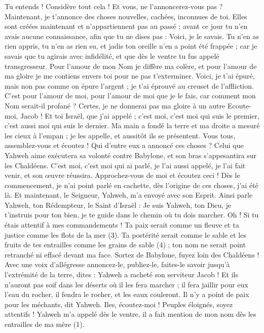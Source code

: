 \begin{multicols}{2}
{Tu entends ! Considère tout cela ! Et vous, ne l'annoncerez-vous pas ? Maintenant, je t’annonce des choses nouvelles, cachées, inconnues de toi.
Elles sont créées maintenant et n’appartiennent pas au passé ; avant ce jour tu n’en avais aucune connaissance, afin que tu ne dises pas : Voici, je le savais.
Tu n’en as rien appris, tu n’en as rien su, et jadis ton oreille n’en a point été frappée ; car je savais que tu agirais avec infidélité, et que dès le ventre tu fus appelé transgresseur.
Pour l'amour de mon Nom je diffère ma colère, et pour l'amour de ma gloire je me contiens envers toi pour ne pas t’exterminer.
Voici, je t'ai épuré, mais non pas comme on épure l'argent ; je t'ai éprouvé au creuset de l'affliction.
C’est pour l'amour de moi, pour l'amour de moi que je le fais, car comment mon Nom serait-il profané ? Certes, je ne donnerai pas ma gloire à un autre
Ecoute-moi, Jacob ! Et toi Israël, que j’ai appelé ; c'est moi, c’est moi qui suis le premier, c’est aussi moi qui suis le dernier.
Ma main a fondé la terre et ma droite a mesuré les cieux à l'empan ; je les appelle, et aussitôt ils se présentent.
Vous tous, assemblez-vous et écoutez ! Qui d’entre eux a annoncé ces choses ? Celui que Yahweh aime exécutera sa volonté contre Babylone, et son bras s’appesantira sur les Chaldéens.
C'est moi, c'est moi qui ai parlé, je l'ai aussi appelé, je l'ai fait venir, et son œuvre réussira.
Approchez-vous de moi et écoutez ceci ! Dès le commencement, je n'ai point parlé en cachette, dès l’origine de ces choses, j’ai été là. Et maintenant, le Seigneur, Yahweh, m’a envoyé avec son Esprit.
Ainsi parle Yahweh, ton Rédempteur, le Saint d'Israël : Je suis Yahweh, ton Dieu, je t’instruis pour ton bien, je te guide dans le chemin où tu dois marcher.
Oh ! Si tu étais attentif à mes commandements ! Ta paix serait comme un fleuve et ta justice comme les flots de la mer (3).
Ta postérité serait comme le sable et les fruits de tes entrailles comme les grains de sable (4) ; ton nom ne serait point retranché ni effacé devant ma face.
Sortez de Babylone, fuyez loin des Chaldéens ! Avec une voix d’allégresse annoncez-le, publiez-le, faites-le savoir jusqu’à l’extrémité de la terre, dites : Yahweh a racheté son serviteur Jacob !
Et ils n’auront pas soif dans les déserts où il les fera marcher ; il fera jaillir pour eux l’eau du rocher, il fendra le rocher, et les eaux couleront.
Il n'y a point de paix pour les méchants, dit Yahweh.
\VerseOne{}Iles, écoutez-moi ! Peuples éloignés, soyez attentifs ! Yahweh m'a appelé dès le ventre, il a fait mention de mon nom dès les entrailles de ma mère (1).
}
\end{multicols}
